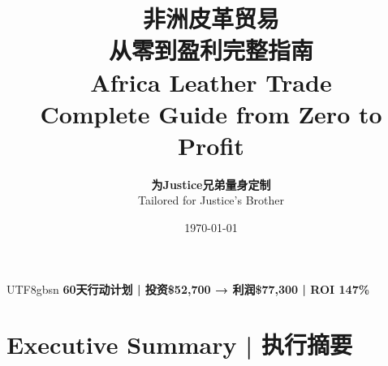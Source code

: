 \documentclass[12pt,a4paper]{article}
\title{
    \textbf{\Huge 非洲皮革贸易}\\[0.5cm]
    \textbf{\Huge 从零到盈利完整指南}\\[0.8cm]
    \Large Africa Leather Trade\\
    \Large Complete Guide from Zero to Profit
}
\author{
    \textbf{为Justice兄弟量身定制}\\
    Tailored for Justice's Brother
}
\date{\today}
\begin{document}
\maketitle

\begin{center}
\begin{tcolorbox}[colback=highlightgreen!10,colframe=highlightgreen,width=0.9\textwidth]
\begin{CJK}{UTF8}{gbsn}
\textbf{\Large 60天行动计划 | 投资\$52,700 → 利润\$77,300 | ROI 147\%}
\end{CJK}
\end{tcolorbox}
\end{center}

\tableofcontents
\newpage

\section{Executive Summary | 执行摘要}
\end{document}
